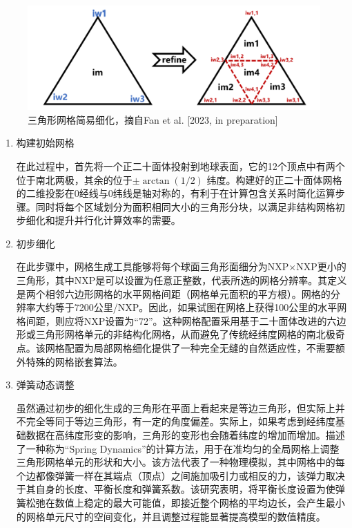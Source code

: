 {
\begin{figure}[htbp]
\centering
\includegraphics{Figures/模式构架/三角形网格简易细化.png}
\caption{三角形网格简易细化，摘自Fan et al. [2023, in preparation]}
\label{fig:三角形网格简易细化}
\end{figure}
}

\begin{enumerate}
\item 构建初始网格

在此过程中，首先将一个正二十面体投射到地球表面，它的12个顶点中有两个位于南北两极，其余的位于$\pm\arctan(1/2)$ 纬度。构建好的正二十面体网格的二维投影在0\textdegree 经线与0\textdegree 纬线是轴对称的，有利于在计算包含关系时简化运算步骤。同时将每个区域划分为面积相同大小的三角形分块，以满足非结构网格初步细化和提升并行化计算效率的需要。

\item 初步细化

在此步骤中，网格生成工具能够将每个球面三角形面细分为NXP×NXP更小的三角形，其中NXP是可以设置为任意正整数，代表所选的网格分辨率。其定义是两个相邻六边形网格的水平网格间距（网格单元面积的平方根）。网格的分辨率大约等于7200公里/NXP。因此，如果试图在网格上获得100公里的水平网格间距，则应将NXP设置为“72”。这种网格配置采用基于二十面体改进的六边形或三角形网格单元的非结构化网格，从而避免了传统经纬度网格的南北极奇点。该网格配置为局部网格细化提供了一种完全无缝的自然适应性，不需要额外特殊的网格嵌套算法。

\item 弹簧动态调整

虽然通过初步的细化生成的三角形在平面上看起来是等边三角形，但实际上并不完全等同于等边三角形，有一定的角度偏差。实际上，如果考虑到经纬度基础数据在高纬度形变的影响，三角形的变形也会随着纬度的增加而增加。\citet{tomita2002optimization}描述了一种称为“Spring Dynamics”的计算方法，用于在准均匀的全局网格上调整三角形网格单元的形状和大小。该方法代表了一种物理模拟，其中网格中的每个边都像弹簧一样在其端点（顶点）之间施加吸引力或相反的力，该弹力取决于其自身的长度、平衡长度和弹簧系数。该研究表明，将平衡长度设置为使弹簧松弛在数值上稳定的最大可能值，即接近整个网格的平均边长，会产生最小的网格单元尺寸的空间变化，并且调整过程能显著提高模型的数值精度。


\end{enumerate}
